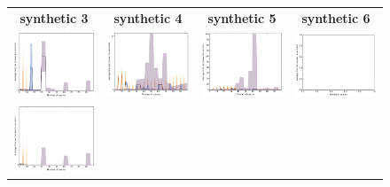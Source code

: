 \documentclass{article}
\renewcommand\[{\begin{equation}}
\renewcommand\]{\end{equation}}
\begin{document}
\begin{figure}[b]
    \centering
    \begin{tabular}{cccc}
        {\bf synthetic 3} & {\bf synthetic 4} & {\bf synthetic 5} & {\bf synthetic 6}
        \\
        \includegraphics[width=12em]{figures/synthetic_3_uniform_cv5_time} &
        \includegraphics[width=12em]{figures/synthetic_4_uniform_cv5_time} &
        \includegraphics[width=12em]{figures/synthetic_5_uniform_cv5_time} &
        \includegraphics[width=12em]{figures/synthetic_6_uniform_cv5_time}
        \\
        \includegraphics[width=12em]{figures/synthetic_3_uniform_sparse_cv5_time} &

\end{tabular}
\end{figure}
\end{document}
